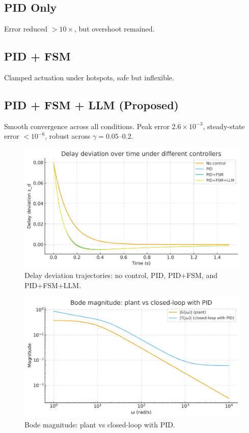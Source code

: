 \documentclass[conference]{IEEEtran}
\begin{document}
\subsection{PID Only}
Error reduced $>10\times$, but overshoot remained.  

\subsection{PID + FSM}
Clamped actuation under hotspots, safe but inflexible.  

\subsection{PID + FSM + LLM (Proposed)}
Smooth convergence across all conditions. Peak error $2.6 \times 10^{-3}$, steady-state error $<10^{-6}$, robust across $\gamma=0.05$--0.2.  

\begin{figure}[h]
\centering
\includegraphics[width=0.9\columnwidth]{figs/fig2_time_response.png}
\caption{Delay deviation trajectories: no control, PID, PID+FSM, and PID+FSM+LLM.}
\label{fig:time}
\end{figure}

\begin{figure}[h]
\centering
\includegraphics[width=0.9\columnwidth]{figs/fig3_bode_magnitude.png}
\caption{Bode magnitude: plant vs closed-loop with PID.}
\label{fig:bode}
\end{figure}
\end{document}
